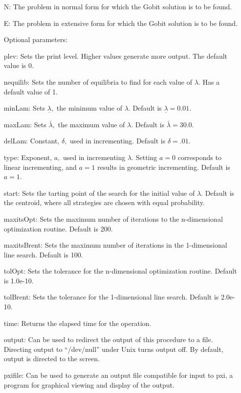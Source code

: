 \begin{itemize}
\bd
\item
[N:] The problem in normal form for which the Gobit solution is to be
found.
\item	
[E:] The problem in extensive form for which the Gobit solution is to
be found.
\ed

\item
[Optional parameters:]\hfil\null

\bd
\item
[plev:] Sets the print level.  Higher values generate more output.
The default value is 0.
\item
[nequilib:] Sets the number of equilibria to find for each value of
$\lambda$.  Has a default value of 1.
\item
[minLam:] Sets $\underline\lambda,$ the minimum value of $\lambda.$
Default is $\underline\lambda = 0.01$.
\item
[maxLam:] Sets $\bar\lambda,$ the maximum value of $\lambda.$  Default is
$\bar\lambda = 30.0.$
\item
[delLam:]  Constant, $\delta,$ used in incrementing.   Default is
$\delta = .01.$
\item
[type:] Exponent, $a,$ used in incrementing $\lambda.$  Setting $a = 0$
corresponds to linear incrementing, and $a = 1$ results in geometric
incrementing.  Default is $a = 1$.
\item
[start:] Sets the tarting point of the search for the initial value of
$\lambda.$  Default is the centroid, where all strategies are chosen
with equal probability.  
\item
[maxitsOpt:] Sets the maximum number of iterations to the
n-dimensional optimization routine.  Default is 200.
\item
[maxitsBrent:] Sets the maximum number of iterations in the
1-dimensional line search.  Default is 100.
\item
[tolOpt:] Sets the tolerance for the n-dimensional optimization
routine.  Default is 1.0e-10.
\item
[tolBrent:] Sets the tolerance for the 1-dimensional line search.
Default is 2.0e-10.
\item
[time:] Returns the elapsed time for the operation.
\item
[output:] Can be used to redirect the output of this procedure to a
file.  Directing output to ``/dev/null'' under Unix turns output off.
By default, output is directed to the screen.
\item
[pxifile:] Can be used to generate an output file compatible for input
to pxi, a program for graphical viewing and display of the output.  
\ed
\ed


\end{itemize}
